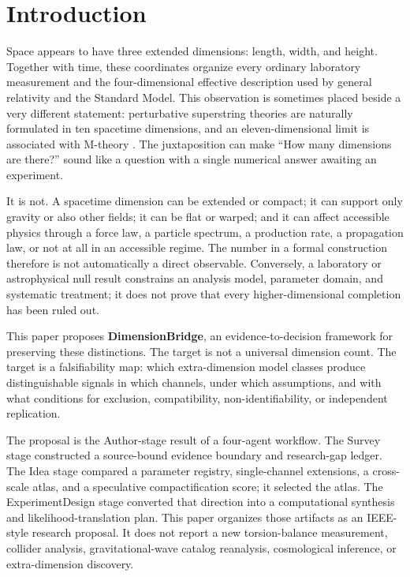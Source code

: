 \documentclass[conference]{IEEEtran}
\begin{document}
\section{Introduction}

Space appears to have three extended dimensions: length, width, and height. Together with time, these coordinates organize every ordinary laboratory measurement and the four-dimensional effective description used by general relativity and the Standard Model. This observation is sometimes placed beside a very different statement: perturbative superstring theories are naturally formulated in ten spacetime dimensions, and an eleven-dimensional limit is associated with M-theory \cite{polchinski,witten}. The juxtaposition can make ``How many dimensions are there?'' sound like a question with a single numerical answer awaiting an experiment.

It is not. A spacetime dimension can be extended or compact; it can support only gravity or also other fields; it can be flat or warped; and it can affect accessible physics through a force law, a particle spectrum, a production rate, a propagation law, or not at all in an accessible regime. The number in a formal construction therefore is not automatically a direct observable. Conversely, a laboratory or astrophysical null result constrains an analysis model, parameter domain, and systematic treatment; it does not prove that every higher-dimensional completion has been ruled out.

This paper proposes \textbf{DimensionBridge}, an evidence-to-decision framework for preserving these distinctions. The target is not a universal dimension count. The target is a falsifiability map: which extra-dimension model classes produce distinguishable signals in which channels, under which assumptions, and with what conditions for exclusion, compatibility, non-identifiability, or independent replication.

The proposal is the Author-stage result of a four-agent workflow. The Survey stage constructed a source-bound evidence boundary and research-gap ledger. The Idea stage compared a parameter registry, single-channel extensions, a cross-scale atlas, and a speculative compactification score; it selected the atlas. The ExperimentDesign stage converted that direction into a computational synthesis and likelihood-translation plan. This paper organizes those artifacts as an IEEE-style research proposal. It does not report a new torsion-balance measurement, collider analysis, gravitational-wave catalog reanalysis, cosmological inference, or extra-dimension discovery.
\end{document}
